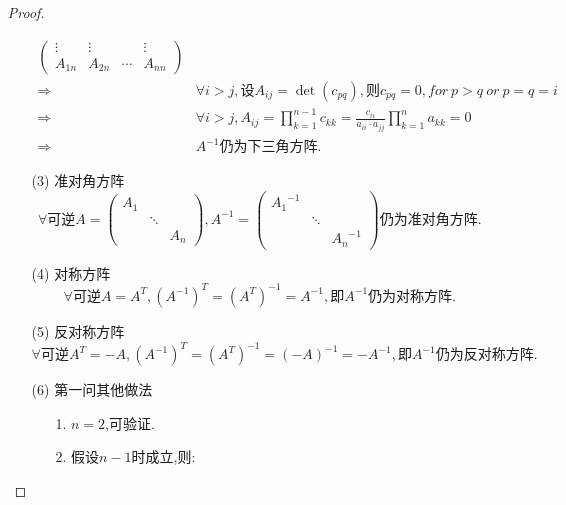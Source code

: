 \documentclass{article}
\begin{document}
\begin{enumerate}
\begin{proof}
\begin{enumerate}
\begin{align*}
\begin{pmatrix}
                        \vdots & \vdots &        & \vdots\\
                        A_{1n} & A_{2n} & \cdots & A_{nn}
                    \end{pmatrix}\\
                    \Rightarrow
                    &\forall i>j,\mbox{设}A_{ij}=\det{(c_{pq})},
                    \mbox{则}c_{pq}=0,for\ p>q\ or\ p=q=i\\
                    \Rightarrow
                    &\forall i>j,A_{ij}=\prod\limits_{k=1}^{n-1} c_{kk}=\frac{c_{ii}}{a_{ii}\cdot a_{jj}} \prod\limits_{k=1}^{n}a_{kk}=0\\
                    \Rightarrow
                    &A^{-1}\mbox{仍为下三角方阵.}
                \end{align*}
                \item [(3)]准对角方阵
                \[
                    \forall \mbox{可逆}A=
                    \begin{pmatrix}
                        A_1&      & \\
                           &\ddots& \\
                           &      &A_n
                    \end{pmatrix},
                    A^{-1}=
                    \begin{pmatrix}
                        {A_1}^{-1}&      & \\
                                  &\ddots& \\
                                  &      &{A_n}^{-1}
                    \end{pmatrix}
                    \mbox{仍为准对角方阵.}
                \]
                \item [(4)]对称方阵
                \[
                    \forall \mbox{可逆}A=A^T,
                    {(A^{-1})}^T={(A^T)}^{-1}=A^{-1},
                    \mbox{即$A^{-1}$仍为对称方阵.}
                \]
                \item [(5)]反对称方阵
                \[
                    \forall \mbox{可逆}A^T=-A,
                    {(A^{-1})}^T={(A^T)}^{-1}={(-A)}^{-1}=-A^{-1},
                    \mbox{即$A^{-1}$仍为反对称方阵.}
                \]
                \item [(6)]第一问其他做法
                \begin{enumerate}
                    \item [1.]$n=2$,可验证.
                    \item [2.]假设$n-1$时成立,则:

\end{enumerate}
\end{enumerate}
\end{proof}
\end{enumerate}
\end{document}
